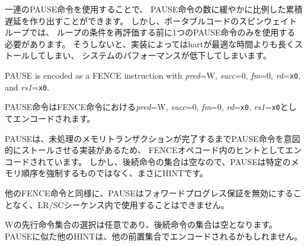 \begin{commentary}
\begin{comment}
A series of PAUSE instructions can be used to create a cumulative delay loosely
proportional to the number of PAUSE instructions.
In spin-wait loops in portable code, however, only one PAUSE instruction should
be used before re-evaluating loop conditions, else the hart might stall longer
than optimal on some implementations, degrading system performance.
\end{comment}

一連のPAUSE命令を使用することで、
PAUSE命令の数に緩やかに比例した累積遅延を作り出すことができます。
しかし、ポータブルコードのスピンウェイトループでは、
ループの条件を再評価する前に1つのPAUSE命令のみを使用する必要があります。
そうしないと、実装によってはhartが最適な時間よりも長くストールしてしまい、
システムのパフォーマンスが低下してしまいます。
\end{commentary}

PAUSE is encoded as a FENCE instruction with {\em pred}=W, {\em succ}=0,
{\em fm}=0, {\em rd}={\tt x0}, and {\em rs1}={\tt x0}.

PAUSE命令はFENCE命令における{\em pred}=W, {\em succ}=0, 
{\em fm}=0, {\em rd}={\tt x0}, {\em rs1}={\tt x0}としてエンコードされます。

\begin{commentary}
\begin{comment}
PAUSE is encoded as a hint within the FENCE opcode because some
implementations are expected to deliberately stall the PAUSE instruction until outstanding
memory transactions have completed.
Because the successor set is null, however, PAUSE does not {\em mandate} any
particular memory ordering---hence, it truly is a HINT.
\end{comment}

PAUSEは、未処理のメモリトランザクションが完了するまでPAUSE命令を意図的にストールさせる実装があるため、
FENCEオペコード内のヒントとしてエンコードされています。
しかし、後続命令の集合は空なので、PAUSEは特定のメモリ順序を強制するものではなく、まさにHINTです。

\begin{comment}
Like other FENCE instructions, PAUSE cannot be used within LR/SC sequences
without voiding the forward-progress guarantee.
\end{comment}

他のFENCE命令と同様に、PAUSEはフォワードプログレス保証を無効にすることなく、LR/SCシーケンス内で使用することはできません。

\begin{comment}
The choice of a predecessor set of W is arbitrary, since the successor set is
null.
Other HINTs similar to PAUSE might be encoded with other predecessor sets.
\end{comment}

Wの先行命令集合の選択は任意であり、後続命令の集合は空となります。
PAUSEに似た他のHINTは、他の前置集合でエンコードされるかもしれません。

\end{commentary}
